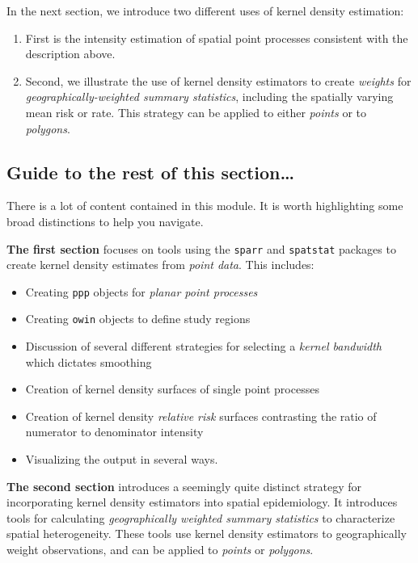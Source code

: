 \documentclass[
]{book}
\providecommand{\tightlist}{%
  \setlength{\itemsep}{0pt}\setlength{\parskip}{0pt}}
\newenvironment{rmdtip}[1]
  {
  \begin{itemize}
  \renewcommand{\labelitemi}{
    \raisebox{-.7\height}[0pt][0pt]{
      {\setkeys{Gin}{width=3em,keepaspectratio}\texttt{[image: images/\#1]}}
    }
  }
  \setlength{\fboxsep}{1em}
  \begin{tip}
  \item
  }
  {
  \end{tip}
  \end{itemize}
  }
\begin{document}
In the next section, we introduce two different uses of kernel density estimation:

\begin{enumerate}
\def\labelenumi{\arabic{enumi}.}
\tightlist
\item
  First is the intensity estimation of spatial point processes consistent with the description above.
\item
  Second, we illustrate the use of kernel density estimators to create \emph{weights} for \emph{geographically-weighted summary statistics}, including the spatially varying mean risk or rate. This strategy can be applied to either \emph{points} or to \emph{polygons}.
\end{enumerate}

\hypertarget{guide-to-the-rest-of-this-section}{%
\subsection{Guide to the rest of this section\ldots{}}\label{guide-to-the-rest-of-this-section}}

\begin{rmdtip}{tip}
There is a lot of content contained in this module. It is worth highlighting some broad distinctions to help you navigate.

\textbf{The first section} focuses on tools using the \texttt{sparr} and \texttt{spatstat} packages to create kernel density estimates from \emph{point data}. This includes:

\begin{itemize}
\tightlist
\item
  Creating \texttt{ppp} objects for \emph{planar point processes}
\item
  Creating \texttt{owin} objects to define study regions
\item
  Discussion of several different strategies for selecting a \emph{kernel bandwidth} which dictates smoothing
\item
  Creation of kernel density surfaces of single point processes
\item
  Creation of kernel density \emph{relative risk} surfaces contrasting the ratio of numerator to denominator intensity
\item
  Visualizing the output in several ways.
\end{itemize}

\textbf{The second section} introduces a seemingly quite distinct strategy for incorporating kernel density estimators into spatial epidemiology. It introduces tools for calculating \emph{geographically weighted summary statistics} to characterize spatial heterogeneity. These tools use kernel density estimators to geographically weight observations, and can be applied to \emph{points} or \emph{polygons}.

\end{rmdtip}
\end{document}
